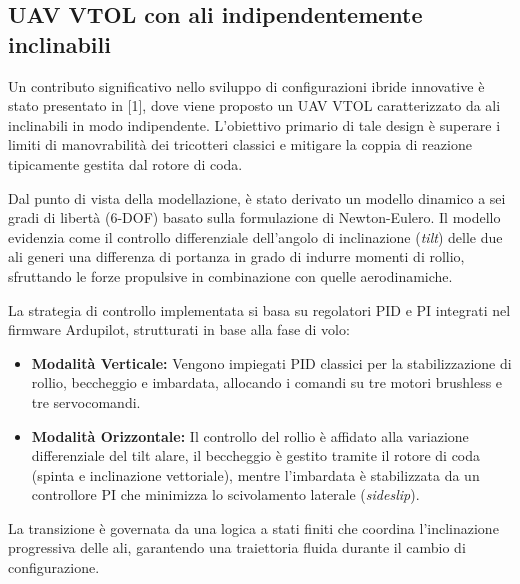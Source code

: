 \documentclass[a4paper,12pt]{article}
\begin{document}
\subsection{UAV VTOL con ali indipendentemente inclinabili}
Un contributo significativo nello sviluppo di configurazioni ibride innovative è stato presentato in [1], dove viene proposto un UAV VTOL caratterizzato da ali inclinabili in modo indipendente. L'obiettivo primario di tale design è superare i limiti di manovrabilità dei tricotteri classici e mitigare la coppia di reazione tipicamente gestita dal rotore di coda.

Dal punto di vista della modellazione, è stato derivato un modello dinamico a sei gradi di libertà (6-DOF) basato sulla formulazione di Newton-Eulero. Il modello evidenzia come il controllo differenziale dell'angolo di inclinazione (\textit{tilt}) delle due ali generi una differenza di portanza in grado di indurre momenti di rollio, sfruttando le forze propulsive in combinazione con quelle aerodinamiche.

La strategia di controllo implementata si basa su regolatori PID e PI integrati nel firmware Ardupilot, strutturati in base alla fase di volo:
\begin{itemize}
    \item \textbf{Modalità Verticale:} Vengono impiegati PID classici per la stabilizzazione di rollio, beccheggio e imbardata, allocando i comandi su tre motori brushless e tre servocomandi.
    \item \textbf{Modalità Orizzontale:} Il controllo del rollio è affidato alla variazione differenziale del tilt alare, il beccheggio è gestito tramite il rotore di coda (spinta e inclinazione vettoriale), mentre l'imbardata è stabilizzata da un controllore PI che minimizza lo scivolamento laterale (\textit{sideslip}).
\end{itemize}
La transizione è governata da una logica a stati finiti che coordina l'inclinazione progressiva delle ali, garantendo una traiettoria fluida durante il cambio di configurazione.
\end{document}
